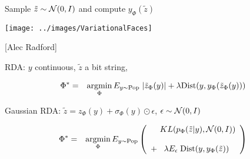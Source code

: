 {\centerline{Sample {\color{red} $\tilde{z} \sim {\cal N}(0,I)$} and compute {\color{red} $y_\Phi(\tilde{z})$}}
\vfill
\centerline{\texttt{[image: ../images/VariationalFaces]}}
\centerline{[Alec Radford]}


RDA: $y$ continuous, $\tilde{z}$ a bit string,

{\color{red}
\begin{eqnarray*}
\Phi^* &  = &  \operatorname*{argmin}_\Phi E_{y \sim \mathrm{Pop}} \;|\tilde{z}_\Phi(y)| + \lambda \mathrm{Dist}(y,y_\Phi(\tilde{z}_\Phi(y)))
\end{eqnarray*}
}

\vfill
Gaussian RDA: {\color{red} $\tilde{z} = z_\Phi(y) + \sigma_\Phi(y) \odot \epsilon$,\hspace{2em} $\epsilon \sim {\cal N}(0,I)$}

{\color{red}
\begin{eqnarray*}
\Phi^* & = & \operatorname*{argmin}_\Phi E_{y \sim \mathrm{Pop}}\left(\begin{array}{l}\;\;\; \;KL(p_\Phi(\tilde{z}|y),{\cal N}(0,I)) \\ \\ + \;\;\;\lambda E_\epsilon\; \mathrm{Dist}(y,y_\Phi(\tilde{z})) \end{array}\right)
\end{eqnarray*}
}


}

